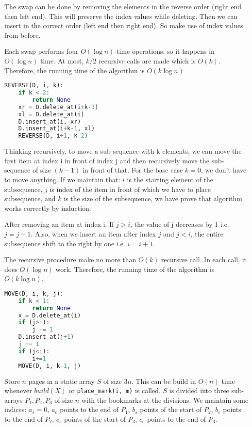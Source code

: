 \documentclass[12pt,twoside]{article}
\begin{document}
\begin{problems}
\begin{problemparts}
The swap can be done by removing the elements in the reverse order (right end then left end). This will preserve the index values while deleting. Then we can insert in the correct order (left end then right end). So make use of index values from before.


Each swap performs four $O(\log n)$-time operations, so it happens in $O(\log n)$ time. At most, $k/2$ recursive calls are made which is $O(k)$. Therefore, the running time of the algorithm is $O(k\log n)$

\begin{lstlisting}[language=Python]
REVERSE(D, i, k):
	if k < 2:
		return None
	xr = D.delete_at(i+k-1)
	xl = D.delete_at(i)
	D.insert_at(i, xr)
	D.insert_at(i+k-1, xl)
	REVERSE(D, i+1, k-2)
\end{lstlisting}

\problempart %

Thinking recursively, to move a sub-sequence with k elements, we can move the first item at index i in front of index j and then recursively move the sub-sequence of size $(k-1)$ in front of that. For the base case $k = 0$, we don't have to move anything. If we maintain that: $i$ is the starting element of the subsequence, $j$ is index of the item in front of which we have to place subsequence, and $k$ is the size of the subsequence, we have prove that algorithm works correctly by induction.

After removing an item at index i. If $j>i$, the value of j decreases by 1 i.e. $j = j-1$. Also, when we insert an item after index $j$ and $j<i$, the entire subsequence shift to the right by one i.e. $i = i+1$. 

The recursive procedure make no more than $O(k)$ recursive call. In each call, it does $O(\log n)$ work. Therefore, the running time of the algorithm is $O(k \log n)$.

\begin{lstlisting}[language=Python]
MOVE(D, i, k, j):
	if k < 1:
		return None
	x = D.delete_at(i)
	if (j>i):
		j -= 1
	D.insert_at(j+1)
	j += 1
	if (j<i):
		i+=1
	MOVE(D, i, k-1, j)
\end{lstlisting}


\end{problemparts}

\newpage
\problem  %

Store $n$ pages in a static array $S$ of size $3n$. This can be build in $O(n)$ time whenever $build(X)$ or \lstinline{place_mark(i, m)} is called. $S$ is divided into three sub-arrays $P_1, P_2, P_3$ of size $n$ with the bookmarks at the divisions. We maintain some indices: $a_s=0$, $a_e$ points to the end of $P_1$, $b_s$ points of the start of $P_2$, $b_e$ points to the end of $P_2$, $c_s$ points of the start of $P_3$, $c_e$ points to the end of $P_3$. 


\end{problems}
\end{document}
